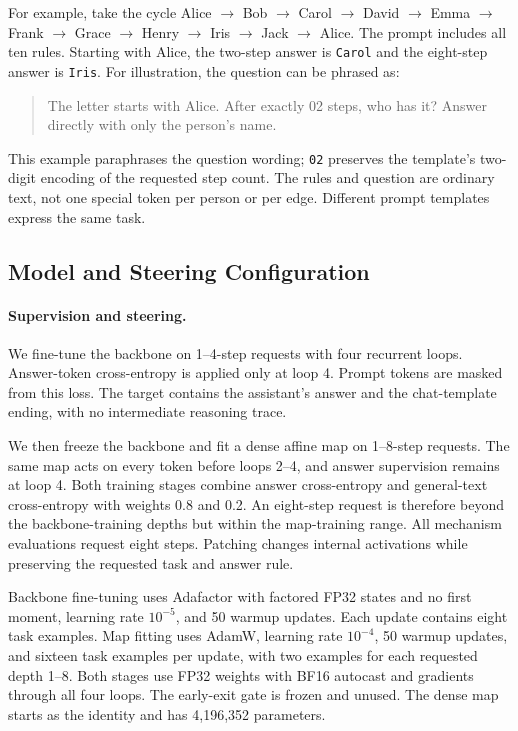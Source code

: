 \documentclass{article}
\begin{document}
For example, take the cycle Alice $\to$ Bob $\to$ Carol $\to$ David $\to$ Emma $\to$ Frank $\to$ Grace $\to$ Henry $\to$ Iris $\to$ Jack $\to$ Alice. The prompt includes all ten rules. Starting with Alice, the two-step answer is \texttt{Carol} and the eight-step answer is \texttt{Iris}. For illustration, the question can be phrased as:
\begin{quote}
The letter starts with Alice. After exactly 02 steps, who has it? Answer directly with only the person's name.
\end{quote}
This example paraphrases the question wording; \texttt{02} preserves the template's two-digit encoding of the requested step count. The rules and question are ordinary text, not one special token per person or per edge. Different prompt templates express the same task.

\subsection{Model and Steering Configuration}
\label{app:ouro-config}

\paragraph{Supervision and steering.}
We fine-tune the backbone on 1--4-step requests with four recurrent loops. Answer-token cross-entropy is applied only at loop 4. Prompt tokens are masked from this loss. The target contains the assistant's answer and the chat-template ending, with no intermediate reasoning trace.

We then freeze the backbone and fit a dense affine map on 1--8-step requests. The same map acts on every token before loops 2--4, and answer supervision remains at loop 4. Both training stages combine answer cross-entropy and general-text cross-entropy with weights 0.8 and 0.2. An eight-step request is therefore beyond the backbone-training depths but within the map-training range. All mechanism evaluations request eight steps. Patching changes internal activations while preserving the requested task and answer rule.

Backbone fine-tuning uses Adafactor with factored FP32 states and no first moment, learning rate $10^{-5}$, and 50 warmup updates. Each update contains eight task examples. Map fitting uses AdamW, learning rate $10^{-4}$, 50 warmup updates, and sixteen task examples per update, with two examples for each requested depth 1--8. Both stages use FP32 weights with BF16 autocast and gradients through all four loops. The early-exit gate is frozen and unused. The dense map starts as the identity and has 4,196,352 parameters.
\end{document}
